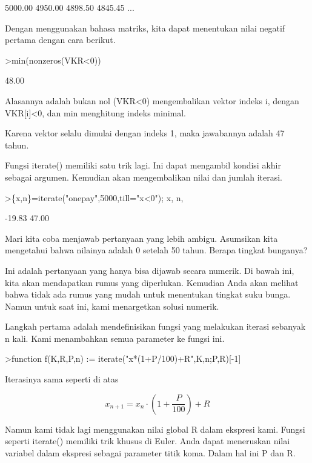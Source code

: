 \begin{eulernotebook}
\begin{eulercomment}
\begin{eulercomment}
\begin{euleroutput}
      5000.00     4950.00     4898.50     4845.45     ...
\end{euleroutput}
\begin{eulercomment}
Dengan menggunakan bahasa matriks, kita dapat menentukan nilai negatif
pertama dengan cara berikut.
\end{eulercomment}
\begin{eulerprompt}
>min(nonzeros(VKR<0))
\end{eulerprompt}
\begin{euleroutput}
        48.00 
\end{euleroutput}
\begin{eulercomment}
Alasannya adalah bukan nol (VKR\textless{}0) mengembalikan vektor indeks i,
dengan VKR[i]\textless{}0, dan min menghitung indeks minimal.

Karena vektor selalu dimulai dengan indeks 1, maka jawabannya adalah
47 tahun.

Fungsi iterate() memiliki satu trik lagi. Ini dapat mengambil kondisi
akhir sebagai argumen. Kemudian akan mengembalikan nilai dan jumlah
iterasi.
\end{eulercomment}
\begin{eulerprompt}
>\{x,n\}=iterate("onepay",5000,till="x<0"); x, n,
\end{eulerprompt}
\begin{euleroutput}
       -19.83 
        47.00 
\end{euleroutput}
\begin{eulercomment}
Mari kita coba menjawab pertanyaan yang lebih ambigu. Asumsikan kita
mengetahui bahwa nilainya adalah 0 setelah 50 tahun. Berapa tingkat
bunganya?

Ini adalah pertanyaan yang hanya bisa dijawab secara numerik. Di bawah
ini, kita akan mendapatkan rumus yang diperlukan. Kemudian Anda akan
melihat bahwa tidak ada rumus yang mudah untuk menentukan tingkat suku
bunga. Namun untuk saat ini, kami menargetkan solusi numerik.

Langkah pertama adalah mendefinisikan fungsi yang melakukan iterasi
sebanyak n kali. Kami menambahkan semua parameter ke fungsi ini.
\end{eulercomment}
\begin{eulerprompt}
>function f(K,R,P,n) := iterate("x*(1+P/100)+R",K,n;P,R)[-1]
\end{eulerprompt}
\begin{eulercomment}
Iterasinya sama seperti di atas

\end{eulercomment}
\begin{eulerformula}
\[
x_{n+1} = x_n \cdot \left(1+ \frac{P}{100}\right) + R
\]
\end{eulerformula}
\begin{eulercomment}
Namun kami tidak lagi menggunakan nilai global R dalam ekspresi kami.
Fungsi seperti iterate() memiliki trik khusus di Euler. Anda dapat
meneruskan nilai variabel dalam ekspresi sebagai parameter titik koma.
Dalam hal ini P dan R.



\end{eulercomment}
\end{eulercomment}
\end{eulercomment}
\end{eulernotebook}
